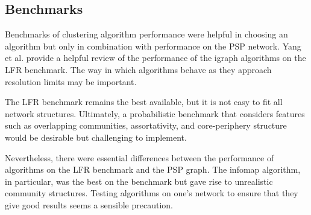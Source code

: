  
 
 \subsection{Benchmarks}
 
Benchmarks of clustering algorithm performance were helpful in choosing an algorithm but only in combination with performance on the PSP network. Yang et al. \cite{yang2016comparative} provide a helpful review of the performance of the igraph algorithms on the LFR benchmark. The way in which algorithms behave as they approach resolution limits may be important.

The LFR benchmark remains the best available, but it is not easy to fit all network structures. Ultimately, a probabilistic benchmark that considers features such as overlapping communities, assortativity, and core-periphery structure would be desirable but challenging to implement. 

Nevertheless, there were essential differences between the performance of algorithms on the LFR benchmark and the PSP graph. The infomap algorithm, in particular, was the best on the benchmark but gave rise to unrealistic community structures. Testing algorithms on one's network to ensure that they give good results seems a sensible precaution.



